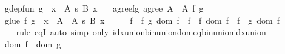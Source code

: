 \begin{isabellebody}
\ \ \ g{\isacharunderscore}{\kern0pt}dep{\isacharunderscore}{\kern0pt}fun{\isacharcolon}{\kern0pt}\ {\isachardoublequoteopen}g\ {\isasymin}\ {\isacharparenleft}{\kern0pt}x\ {\isasymin}\ A{\isacharprime}{\kern0pt}{\isacharparenright}{\kern0pt}\ {\isasymrightarrow}s\ B\ x{\isachardoublequoteclose}\isanewline
\ \ \ agree{\isacharunderscore}{\kern0pt}fg{\isacharcolon}{\kern0pt}\ {\isachardoublequoteopen}agree\ {\isacharparenleft}{\kern0pt}A\ {\isasyminter}\ A{\isacharprime}{\kern0pt}{\isacharparenright}{\kern0pt}\ {\isacharbraceleft}{\kern0pt}f{\isacharcomma}{\kern0pt}\ g{\isacharbraceright}{\kern0pt}{\isachardoublequoteclose}\isanewline
\ \ \ {\isachardoublequoteopen}glue\ {\isacharbraceleft}{\kern0pt}f{\isacharcomma}{\kern0pt}\ g{\isacharbraceright}{\kern0pt}\ {\isasymin}\ {\isacharparenleft}{\kern0pt}x\ {\isasymin}\ A\ {\isasymunion}\ A{\isacharprime}{\kern0pt}{\isacharparenright}{\kern0pt}\ {\isasymrightarrow}s\ B\ x{\isachardoublequoteclose}\isanewline
%
\isadelimproof
%
\endisadelimproof
%
\isatagproof
{}\isamarkupfalse%
\ {\isacharminus}{\kern0pt}\isanewline
\ \ \isamarkupfalse%
\ {\isachardoublequoteopen}{\isacharparenleft}{\kern0pt}{\isasymUnion}f\ {\isasymin}\ {\isacharbraceleft}{\kern0pt}f{\isacharcomma}{\kern0pt}\ g{\isacharbraceright}{\kern0pt}{\isachardot}{\kern0pt}\ dom\ f{\isacharparenright}{\kern0pt}\ {\isacharequal}{\kern0pt}\ {\isacharparenleft}{\kern0pt}{\isasymUnion}f\ {\isasymin}\ {\isacharbraceleft}{\kern0pt}f{\isacharbraceright}{\kern0pt}{\isachardot}{\kern0pt}\ dom\ f{\isacharparenright}{\kern0pt}\ {\isasymunion}\ {\isacharparenleft}{\kern0pt}{\isasymUnion}f\ {\isasymin}\ {\isacharbraceleft}{\kern0pt}g{\isacharbraceright}{\kern0pt}{\isachardot}{\kern0pt}\ dom\ f{\isacharparenright}{\kern0pt}{\isachardoublequoteclose}\isanewline
\ \ \ \ \isamarkupfalse%
\ {\isacharparenleft}{\kern0pt}rule\ eqI{\isacharparenright}{\kern0pt}\ {\isacharparenleft}{\kern0pt}auto\ simp\ only{\isacharcolon}{\kern0pt}\ idx{\isacharunderscore}{\kern0pt}union{\isacharunderscore}{\kern0pt}bin{\isacharunderscore}{\kern0pt}union{\isacharunderscore}{\kern0pt}dom{\isacharunderscore}{\kern0pt}eq{\isacharunderscore}{\kern0pt}bin{\isacharunderscore}{\kern0pt}union{\isacharunderscore}{\kern0pt}idx{\isacharunderscore}{\kern0pt}union{\isacharparenright}{\kern0pt}\isanewline
\ \ \isamarkupfalse%
\ \isamarkupfalse%
\ {\isachardoublequoteopen}{\isachardot}{\kern0pt}{\isachardot}{\kern0pt}{\isachardot}{\kern0pt}\ {\isacharequal}{\kern0pt}\ dom\ f\ {\isasymunion}\ dom\ g{\isachardoublequoteclose}\ \isamarkupfalse%

\end{isabellebody}
